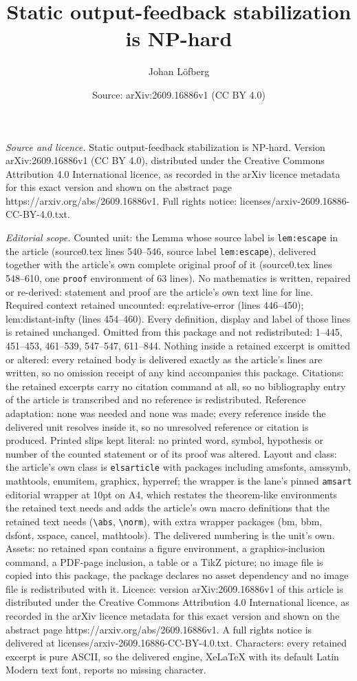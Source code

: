 \documentclass[10pt,a4paper]{amsart}
\title[Static output-feedback stabilization is NP-hard]{Static output-feedback stabilization is NP-hard}
\author{Johan L\"ofberg}
\date{Source: arXiv:2609.16886v1 (CC BY 4.0)}
\begin{document}
\maketitle

\noindent\emph{Source and licence.} Static output-feedback stabilization is NP-hard. Version arXiv:2609.16886v1 (CC BY 4.0), distributed under the Creative Commons Attribution 4.0 International licence, as recorded in the arXiv licence metadata for this exact version and shown on the abstract page https://arxiv.org/abs/2609.16886v1. Full rights notice: licenses/arxiv-2609.16886-CC-BY-4.0.txt.\par\smallskip

\noindent\textit{Editorial scope.} Counted unit: the Lemma whose source label is \texttt{lem:escape} in the article (source0.tex lines 540--546, source label \texttt{lem:escape}), delivered together with the article's own complete original proof of it (source0.tex lines 548--610, one \texttt{proof} environment of 63 lines). No mathematics is written, repaired or re-derived: statement and proof are the article's own text line for line. Required context retained uncounted: eq:relative-error (lines 446--450); lem:distant-infty (lines 454--460). Every definition, display and label of those lines is retained unchanged. Omitted from this package and not redistributed: 1--445, 451--453, 461--539, 547--547, 611--844. Nothing inside a retained excerpt is omitted or altered: every retained body is delivered exactly as the article's lines are written, so no omission receipt of any kind accompanies this package. Citations: the retained excerpts carry no citation command at all, so no bibliography entry of the article is transcribed and no reference is redistributed. Reference adaptation: none was needed and none was made; every reference inside the delivered unit resolves inside it, so no unresolved reference or citation is produced. Printed slips kept literal: no printed word, symbol, hypothesis or number of the counted statement or of its proof was altered. Layout and class: the article's own class is \texttt{elsarticle} with packages including amsfonts, amssymb, mathtools, enumitem, graphicx, hyperref; the wrapper is the lane's pinned \texttt{amsart} editorial wrapper at 10pt on A4, which restates the theorem-like environments the retained text needs and adds the article's own macro definitions that the retained text needs (\texttt{\textbackslash abs}, \texttt{\textbackslash norm}), with extra wrapper packages (bm, bbm, dsfont, xspace, cancel, mathtools). The delivered numbering is the unit's own. Assets: no retained span contains a figure environment, a graphics-inclusion command, a PDF-page inclusion, a table or a TikZ picture; no image file is copied into this package, the package declares no asset dependency and no image file is redistributed with it. Licence: version arXiv:2609.16886v1 of this article is distributed under the Creative Commons Attribution 4.0 International licence, as recorded in the arXiv licence metadata for this exact version and shown on the abstract page https://arxiv.org/abs/2609.16886v1. A full rights notice is delivered at licenses/arxiv-2609.16886-CC-BY-4.0.txt. Characters: every retained excerpt is pure ASCII, so the delivered engine, XeLaTeX with its default Latin Modern text font, reports no missing character.
\end{document}
